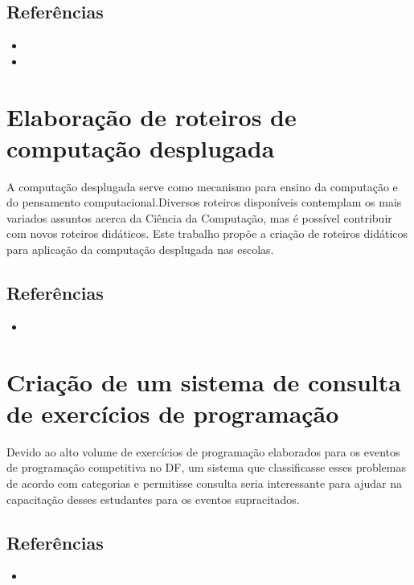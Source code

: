 \documentclass{article}
\begin{document}
\subsection*{Referências}

\begin{itemize}
	\item {}
	\item {}
\end{itemize}


\section*{Elaboração de roteiros de computação desplugada}

A computação desplugada serve como mecanismo para ensino da computação e do pensamento computacional.Diversos roteiros disponíveis contemplam os mais variados assuntos acerca da Ciência da Computação, mas é possível contribuir com novos roteiros didáticos. Este trabalho propõe a criação de roteiros didáticos para aplicação da computação desplugada nas escolas.

\subsection*{Referências}

\begin{itemize}
	\item {}
\end{itemize}


\section*{Criação de um sistema de consulta de exercícios de programação}

Devido ao alto volume de exercícios de programação elaborados para os eventos de programação competitiva no DF, um sistema que classificasse esses problemas de acordo com categorias e permitisse consulta seria interessante para ajudar na capacitação desses estudantes para os eventos supracitados.

\subsection*{Referências}

\begin{itemize}
	\item {}
\end{itemize}
\end{document}
